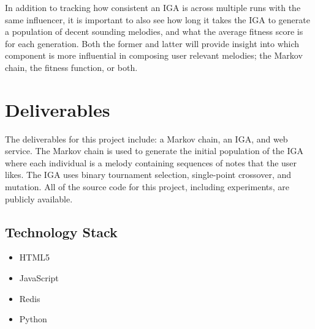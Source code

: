 \documentclass[12pt]{article} %
\begin{document}
In addition to tracking how consistent an IGA is across multiple runs with the same influencer, it is important to also see how long it takes the IGA to generate a population of decent sounding melodies, and what the average fitness score is for each generation. Both the former and latter will provide insight into which component is more influential in composing user relevant melodies; the Markov chain, the fitness function, or both.\\


\section{Deliverables}
The deliverables for this project include: a Markov chain, an IGA, and web service. The Markov chain is used to generate the initial population of the IGA where each individual is a melody containing sequences of notes that the user likes. The IGA uses binary tournament selection, single-point crossover, and mutation. All of the source code for this project, including experiments, are publicly available.

\subsection{Technology Stack}
\begin{itemize}
	\item HTML5	
	\item JavaScript
	\item Redis
	\item Python
\end{itemize}




\end{document}
